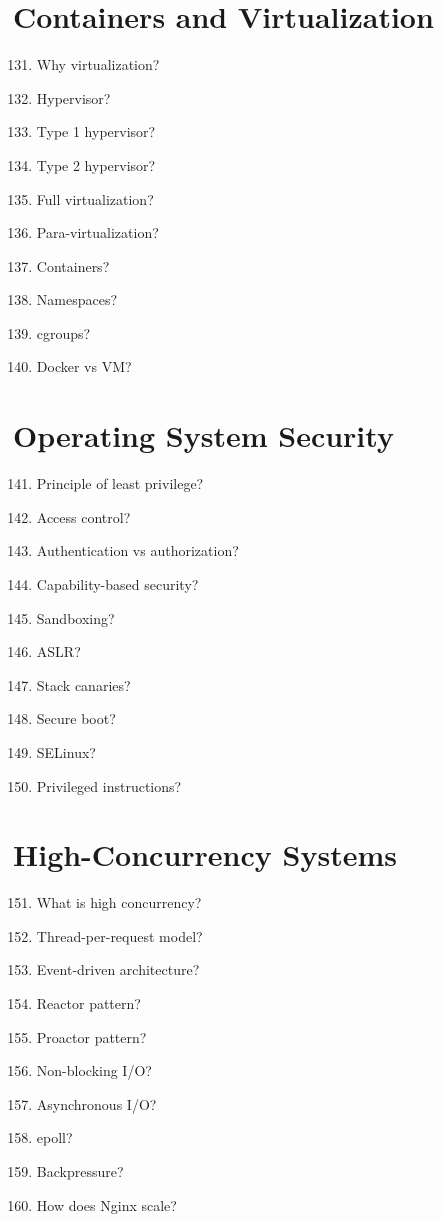 \section{Containers and Virtualization}

\begin{enumerate}
\setcounter{enumi}{130}
\item Why virtualization?
\item Hypervisor?
\item Type 1 hypervisor?
\item Type 2 hypervisor?
\item Full virtualization?
\item Para-virtualization?
\item Containers?
\item Namespaces?
\item cgroups?
\item Docker vs VM?
\end{enumerate}

\section{Operating System Security}

\begin{enumerate}
\setcounter{enumi}{140}
\item Principle of least privilege?
\item Access control?
\item Authentication vs authorization?
\item Capability-based security?
\item Sandboxing?
\item ASLR?
\item Stack canaries?
\item Secure boot?
\item SELinux?
\item Privileged instructions?
\end{enumerate}

\section{High-Concurrency Systems}

\begin{enumerate}
\setcounter{enumi}{150}
\item What is high concurrency?
\item Thread-per-request model?
\item Event-driven architecture?
\item Reactor pattern?
\item Proactor pattern?
\item Non-blocking I/O?
\item Asynchronous I/O?
\item epoll?
\item Backpressure?
\item How does Nginx scale?
\end{enumerate}

